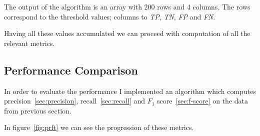 The output of the algorithm is an array with 200 rows and 4 columns.
The rows correspond to the threshold values; columns to \textit{TP}, \textit{TN}, \textit{FP} and \textit{FN}.

Having all these values accumulated we can proceed with computation of all the relevant metrics.

\subsection{Performance Comparison}\label{subsec:performance-comparison}
In order to evaluate the performance I implemented an algorithm which computes precision~\ref{sec:precision},
recall~\ref{sec:recall} and $F_1$ score~\ref{sec:f-score} on the data from previous section.

In figure~\ref{fig:prft} we can see the progression of these metrics.

